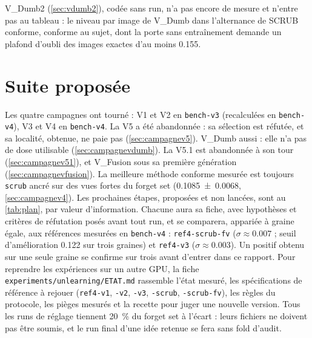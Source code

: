 \documentclass[11pt,a4paper]{article}
\newcommand{\code}[1]{\texttt{#1}}
\newcommand{\chemin}[1]{\nolinkurl{#1}}%
\begin{document}
V\_Dumb2 (\cref{sec:vdumb2}), codée sans run, n'a pas encore de mesure et n'entre pas au
tableau : le niveau par image de V\_Dumb dans l'alternance de SCRUB conforme, conforme au sujet, dont
la porte sans entraînement demande un plafond d'oubli des images exactes d'au moins \num{0.155}.


\section{Suite proposée}\label{sec:plan}
Les quatre campagnes ont tourné : V1 et V2 en \code{bench-v3} (recalculées en \code{bench-v4}), V3 et
V4 en \code{bench-v4}. La V5 a été abandonnée : sa sélection est réfutée, et sa localité, obtenue, ne
paie pas (\cref{sec:campagnev5}). V\_Dumb aussi : elle n'a pas de dose utilisable
(\cref{sec:campagnevdumb}). La V5.1 est abandonnée à son tour (\cref{sec:campagnev51}), et
V\_Fusion sous sa première génération (\cref{sec:campagnevfusion}). La meilleure méthode conforme mesurée est toujours \code{scrub} ancré sur des
vues fortes du forget set (\num{0.1085 +- 0.0068}, \cref{sec:campagnev4}). Les prochaines étapes,
proposées et non lancées, sont au \cref{tab:plan}, par valeur d'information. Chacune aura sa fiche,
avec hypothèses et critères de réfutation posés avant tout run, et se comparera, appariée à graine
égale, aux références mesurées en \code{bench-v4} : \code{ref4-scrub-fv} ($\sigma\approx\num{0.007}$ ;
seuil d'amélioration \num{0.122} sur trois graines) et \code{ref4-v3} ($\sigma\approx\num{0.003}$). Un
positif obtenu sur une seule graine se confirme sur trois avant d'entrer dans ce rapport. Pour
reprendre les expériences sur un autre GPU, la fiche \chemin{experiments/unlearning/ETAT.md}
rassemble l'état mesuré, les spécifications de référence à rejouer (\code{ref4-v1}, \code{-v2},
\code{-v3}, \code{-scrub}, \code{-scrub-fv}), les règles du protocole, les pièges mesurés et la recette
pour juger une nouvelle version. Tous les runs de réglage tiennent \SI{20}{\percent} du forget set à
l'écart : leurs fichiers ne doivent pas être soumis, et le run final d'une idée retenue se fera sans
fold d'audit.
\end{document}
